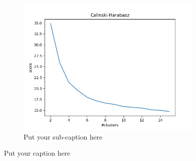 \documentclass{article}
\begin{document}
\begin{figure}[ht]
\begin{subfigure}{.33\textwidth}
  \includegraphics[width=1\linewidth]{1d/Dogs/Calinski dog.png}  
  \caption{Put your sub-caption here}
  \label{fig:sub-second}
\end{subfigure}
\caption{Put your caption here}
\label{Int indiciees dog}
\end{figure}
\end{document}
